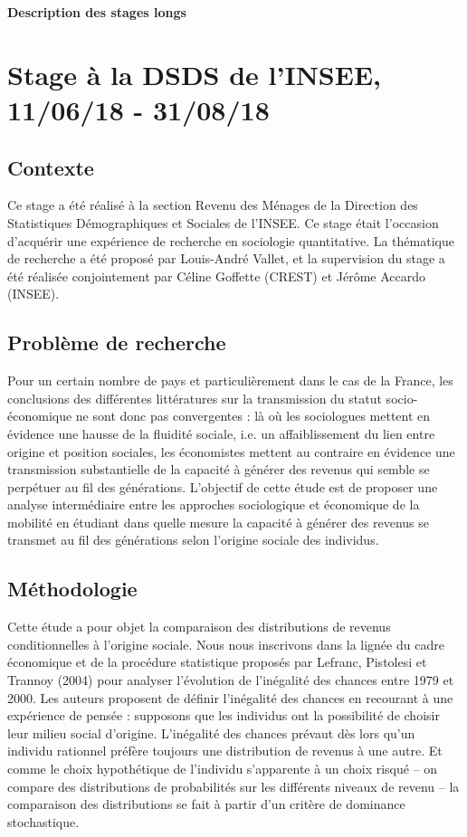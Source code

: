 \documentclass[12pt]{article}
\begin{document}
\begin{center}
\LARGE \textbf{Description des stages longs}
\end{center}

\section{Stage à la DSDS de l'INSEE, 11/06/18 - 31/08/18}

\subsection{Contexte}

Ce stage a été réalisé à la section Revenu des Ménages de la Direction des Statistiques Démographiques et Sociales de l'INSEE. Ce stage était l'occasion d'acquérir une expérience de recherche en sociologie quantitative. La thématique de recherche a été proposé par Louis-André Vallet, et la supervision du stage a été réalisée conjointement par Céline Goffette (CREST) et Jérôme Accardo (INSEE).

\subsection{Problème de recherche}

Pour un certain nombre de pays et particulièrement dans le cas de la France, les conclusions des différentes littératures sur la transmission du statut socio-économique ne sont donc pas convergentes : là où les sociologues mettent en évidence une hausse de la fluidité sociale, i.e. un affaiblissement du lien entre origine et position sociales, les économistes mettent au contraire en évidence une transmission substantielle de la capacité à générer des revenus qui semble se perpétuer au fil des générations. L'objectif de cette étude est de proposer une analyse intermédiaire entre les approches sociologique et économique de la mobilité en étudiant dans quelle mesure la capacité à générer des revenus se transmet au fil des générations selon l'origine sociale des individus.

\subsection{Méthodologie}

Cette étude a pour objet la comparaison des distributions de revenus conditionnelles à l'origine sociale. Nous nous inscrivons dans la lignée du cadre économique et de la procédure statistique proposés par Lefranc, Pistolesi et Trannoy (2004) pour analyser l'évolution de l'inégalité des chances entre 1979 et 2000. Les auteurs proposent de définir l'inégalité des chances en recourant à une expérience de pensée : supposons que les individus ont la possibilité de choisir leur milieu social d'origine. L'inégalité des chances prévaut dès lors qu'un individu rationnel préfère toujours une distribution de revenus à une autre. Et comme le choix hypothétique de l'individu s'apparente à un choix risqué -- on compare des distributions de probabilités sur les différents niveaux de revenu -- la comparaison des distributions se fait à partir d'un critère de dominance stochastique.
\end{document}

